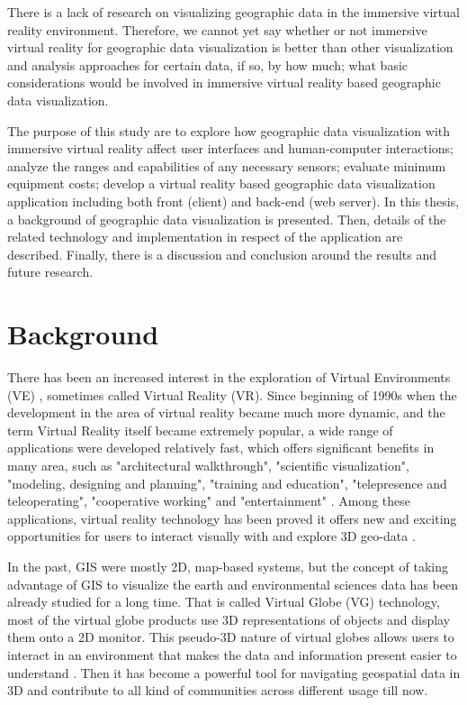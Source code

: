 There is a lack of research on visualizing geographic data in the immersive virtual reality environment. Therefore, we cannot yet say whether or not immersive virtual reality for geographic data visualization is better than other visualization and analysis approaches for certain data, if so, by how much; what basic considerations would be involved in immersive virtual reality based geographic data visualization. 

The purpose of this study are to explore how geographic data visualization with immersive virtual reality affect user interfaces and human-computer interactions; analyze the ranges and capabilities of any necessary sensors; evaluate minimum equipment costs; develop a virtual reality based geographic data visualization application including both front (client) and back-end (web server). In this thesis, a background of geographic data visualization is presented.  Then, details of the related technology and implementation in respect of the application are described. Finally, there is a discussion and conclusion around the results and future research.

\section{Background}
\label{section:background}

There has been an increased interest in the exploration of Virtual Environments (VE) \cite{huang.java-cgi-vr.2002}, sometimes called Virtual Reality (VR). Since beginning of 1990s when the development in the area of virtual reality became much more dynamic, and the term Virtual Reality itself became extremely popular, a wide range of applications were developed relatively fast, which offers significant benefits in many area, such as "architectural walkthrough", "scientific visualization", "modeling, designing and planning", "training and education", "telepresence and teleoperating", "cooperative working" and "entertainment" \cite{mazuryk.vr.1996}. Among these applications, virtual reality technology has been proved it offers new and exciting opportunities for users to interact visually with and explore 3D geo-data \cite{huang.java-cgi-vr.2002}.

In the past, GIS were mostly 2D, map-based systems, but the concept of taking advantage of GIS to visualize the earth and environmental sciences data has been already studied for a long time. That is called Virtual Globe (VG) technology, most of the virtual globe products use 3D representations of objects and display them onto a 2D monitor. This pseudo-3D nature of virtual globes allows users to interact in an environment that makes the data and information present easier to understand \cite{tuttle.virtual-globes.2008}. Then it has become a powerful tool for navigating geospatial data in 3D and contribute to all kind of communities across different usage till now. 

